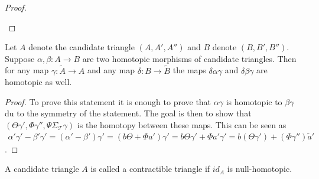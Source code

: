 \begin{proof}
\begin{center}
        \end{center}
    \end{proof}

    \begin{lemma}
        Let $A$ denote the candidate triangle $(A,A',A'')$ and $B$ denote $(B,B',B'')$. Suppose $\alpha, \beta : A \rightarrow B$ are two homotopic morphisms of candidate triangles. Then for any map $\gamma : \widetilde{A} \rightarrow A$ and any map $\delta : B \rightarrow \widetilde{B}$ the maps $\delta\alpha\gamma$ and $\delta\beta\gamma$ are homotopic as well.
    \end{lemma}

    \begin{proof}
        To prove this statement it is enough to prove that $\alpha\gamma$ is homotopic to $\beta\gamma$ du to the symmetry of the statement. The goal is then to show that $(\Theta\gamma ',\Phi\gamma '',\Psi \Sigma_{\mathcal{T}}\gamma)$ is the homotopy between these maps. This can be seen as
        \begin{multline*}
            {\alpha}'{\gamma}'-{\beta}'{\gamma}' = ({\alpha}'-{\beta}'){\gamma}' = (b\Theta +\Phi a'){\gamma}' = b\Theta {\gamma}' + \Phi a'{\gamma}' = b({\Theta}{\gamma}') + ({\Phi}{\gamma}'')\widetilde{a}'
        \end{multline*}.
    \end{proof}

    \begin{definition}
        A candidate triangle $A$ is called a contractible triangle if $id_A$ is null-homotopic.
    \end{definition}

